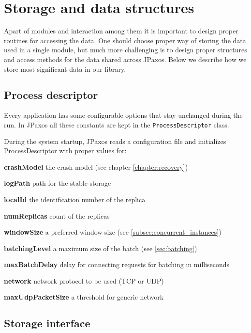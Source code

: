 \section{Storage and data structures}
\label{sec:storage_and_data_structures}

Apart of modules and interaction among them it is important to design proper routines for accessing the data.
One should choose proper way of storing the data used in a single module, but much more challenging is to design proper structures and access methods for the data shared across JPaxos. Below we describe how we store most significant data in our library. %

\subsection{Process descriptor}

Every application has some configurable options that stay unchanged during the run. In JPaxos all these constants are kept in the \texttt{ProcessDescriptor} class.

During the system startup, JPaxos reads a configuration file and initializes ProcessDescriptor with proper values for:
\begin{tightList}[\setlength{\labelwidth}{0em}]
 \item[\textbf{crashModel}] the crash model (see chapter \ref{chapter:recovery})
 \item[\textbf{logPath}] path for the stable storage
 \item[\textbf{localId}] the identification number of the replica
 \item[\textbf{numReplicas}] count of the replicas
 \item[\textbf{windowSize}] a preferred window size (see \ref{subsec:concurrent_instances})
 \item[\textbf{batchingLevel}] a maximum size of the batch (see \ref{sec:batching})
 \item[\textbf{maxBatchDelay}] delay for connecting requests for batching in milliseconds
 \item[\textbf{network}] network protocol to be used (TCP or UDP)
 \item[\textbf{maxUdpPacketSize}] a threshold for generic network
\end{tightList}

\subsection{Storage interface}
\label{subsec:storage_interface}

